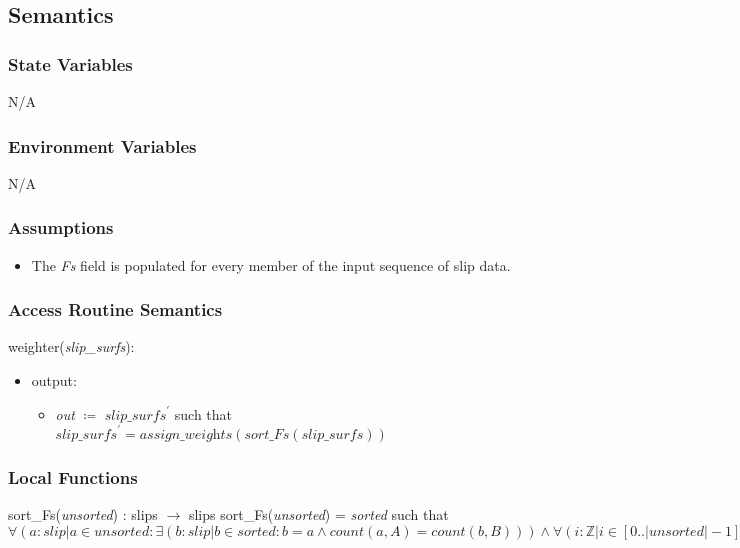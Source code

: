 \documentclass[12pt, titlepage]{article}
\begin{document}
\subsection{Semantics}

\subsubsection{State Variables}
N/A

\subsubsection{Environment Variables}
N/A

\subsubsection{Assumptions}
\begin{itemize}
	\item The \textit{Fs} field is populated for every member of the input 
	sequence of 
	slip data.
\end{itemize}

\subsubsection{Access Routine Semantics}
weighter(\textit{slip\_surfs}):
\begin{itemize}
	\item output:
	\begin{itemize}
		\item[] \textit{out} $\coloneqq$ $\textit{slip\_surfs}^\prime$ such 
		that 
		$\textit{slip\_surfs}^\prime = 
		\textit{assign\_weights}(\textit{sort\_Fs}({\textit{slip\_surfs}}))$
	\end{itemize}
\end{itemize}

\subsubsection{Local Functions}
sort\_Fs(\textit{unsorted}) : slips $\rightarrow$ slips
sort\_Fs(\textit{unsorted}) = \textit{sorted} such that\\
$\forall(a : \textit{slip} | a \in \textit{unsorted} : \exists(b : 
\textit{slip} | b \in \textit{sorted} : b = a \land \textit{count}(a, A) = 
\textit{count}(b, B))) \land \forall(i : \mathbb{Z} | i \in [0..|unsorted|-1] : 
sorted[i].Fs \leq sorted[i+1].Fs)$\\
\end{document}
